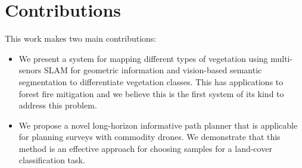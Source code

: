 \section{Contributions}
This work makes two main contributions:
\begin{itemize}
    \item We present a system for mapping different types of vegetation using multi-senors  SLAM for geometric information and vision-based semantic segmentation to differentiate vegetation classes. This has applications to forest fire mitigation and we believe this is the first system of its kind to address this problem. 
    \item We propose a novel long-horizon informative path planner that is applicable for planning surveys with commodity drones. We demonstrate that this method is an effective approach for choosing samples for a land-cover classification task.
\end{itemize}

        


